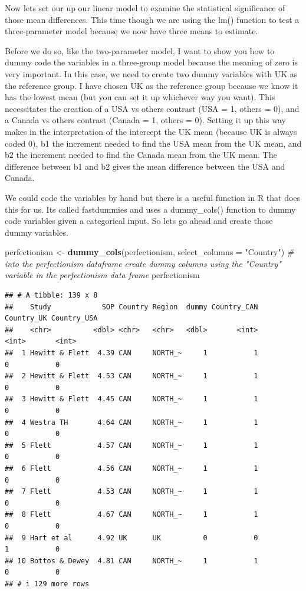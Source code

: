 \documentclass[
]{article}
\newenvironment{Shaded}{\begin{snugshade}}{\end{snugshade}}
\newcommand{\AttributeTok}[1]{\textcolor[rgb]{0.13,0.29,0.53}{#1}}
\newcommand{\CommentTok}[1]{\textcolor[rgb]{0.56,0.35,0.01}{\textit{#1}}}
\newcommand{\FunctionTok}[1]{\textcolor[rgb]{0.13,0.29,0.53}{\textbf{#1}}}
\newcommand{\NormalTok}[1]{#1}
\newcommand{\OtherTok}[1]{\textcolor[rgb]{0.56,0.35,0.01}{#1}}
\newcommand{\StringTok}[1]{\textcolor[rgb]{0.31,0.60,0.02}{#1}}
\begin{document}
Now lets set our up our linear model to examine the statistical
significance of those mean differences. This time though we are using
the lm() function to test a three-parameter model because we now have
three means to estimate.

Before we do so, like the two-parameter model, I want to show you how to
dummy code the variables in a three-group model because the meaning of
zero is very important. In this case, we need to create two dummy
variables with UK as the reference group. I have chosen UK as the
reference group because we know it has the lowest mean (but you can set
it up whichever way you want). This necessitates the creation of a USA
vs others contrast (USA = 1, others = 0), and a Canada vs others
contrast (Canada = 1, others = 0). Setting it up this way makes in the
interpretation of the intercept the UK mean (because UK is always coded
0), b1 the increment needed to find the USA mean from the UK mean, and
b2 the increment needed to find the Canada mean from the UK mean. The
difference between b1 and b2 gives the mean difference between the USA
and Canada.

We could code the variables by hand but there is a useful function in R
that does this for us. Its called fastdummies and uses a dummy\_cols()
function to dummy code variables given a categorical input. So lets go
ahead and create those dummy variables.

\begin{Shaded}
\begin{Highlighting}[]
\NormalTok{perfectionism }\OtherTok{\textless{}{-}} \FunctionTok{dummy\_cols}\NormalTok{(perfectionism, }\AttributeTok{select\_columns =} \StringTok{"Country"}\NormalTok{) }\CommentTok{\# into the perfectionism dataframe create dummy columns using the "Country" variable in the perfectionism data frame}
\NormalTok{perfectionism}
\end{Highlighting}
\end{Shaded}

\begin{verbatim}
## # A tibble: 139 x 8
##    Study            SOP Country Region  dummy Country_CAN Country_UK Country_USA
##    <chr>          <dbl> <chr>   <chr>   <dbl>       <int>      <int>       <int>
##  1 Hewitt & Flett  4.39 CAN     NORTH_~     1           1          0           0
##  2 Hewitt & Flett  4.53 CAN     NORTH_~     1           1          0           0
##  3 Hewitt & Flett  4.45 CAN     NORTH_~     1           1          0           0
##  4 Westra TH       4.64 CAN     NORTH_~     1           1          0           0
##  5 Flett           4.57 CAN     NORTH_~     1           1          0           0
##  6 Flett           4.56 CAN     NORTH_~     1           1          0           0
##  7 Flett           4.53 CAN     NORTH_~     1           1          0           0
##  8 Flett           4.67 CAN     NORTH_~     1           1          0           0
##  9 Hart et al      4.92 UK      UK          0           0          1           0
## 10 Bottos & Dewey  4.81 CAN     NORTH_~     1           1          0           0
## # i 129 more rows
\end{verbatim}
\end{document}
